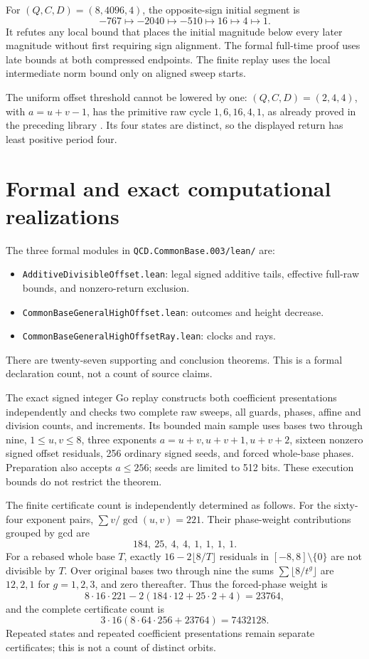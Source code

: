 \documentclass[11pt,letterpaper]{article}
\begin{document}
For \((Q,C,D)=(8,4096,4)\), the opposite-sign initial segment is
\[
-767\longmapsto-2040\longmapsto-510\longmapsto16\longmapsto4\longmapsto1.
\]
It refutes any local bound that places the initial magnitude below every
later magnitude without first requiring sign alignment. The formal
full-time proof uses late bounds at both compressed endpoints. The finite
replay uses the local intermediate norm bound only on aligned sweep starts.

The uniform offset threshold cannot be lowered by one:
\((Q,C,D)=(2,4,4)\), with \(a=u+v-1\), has the primitive raw cycle
\(1,6,16,4,1\), as already proved in the preceding library
\cite{AscendCommonBase}. Its four states are distinct, so the displayed
return has least positive period four.

\section{Formal and exact computational realizations}

The three formal modules in \texttt{QCD.CommonBase.003/lean/} are:
\begin{itemize}
\item \texttt{AdditiveDivisibleOffset.lean}: legal signed additive tails,
  effective full-raw bounds, and nonzero-return exclusion.
\item \texttt{CommonBaseGeneralHighOffset.lean}: outcomes and height decrease.
\item \texttt{CommonBaseGeneralHighOffsetRay.lean}: clocks and rays.
\end{itemize}
There are twenty-seven supporting and conclusion theorems. This is a formal
declaration count, not a count of source claims.

The exact signed integer Go replay constructs both coefficient presentations
independently and checks two complete raw sweeps, all guards, phases, affine
and division counts, and increments. Its bounded main sample uses bases
two through nine, \(1\le u,v\le8\), three exponents \(a=u+v,u+v+1,u+v+2\),
sixteen nonzero signed offset residuals, 256 ordinary signed seeds, and
forced whole-base phases. Preparation also accepts \(a\le256\); seeds are
limited to 512 bits. These execution bounds do not restrict the theorem.

The finite certificate count is independently determined as follows.
For the sixty-four exponent pairs,
\(\sum v/\gcd(u,v)=221\). Their phase-weight contributions grouped by gcd are
\[
184,\ 25,\ 4,\ 4,\ 1,\ 1,\ 1,\ 1.
\]
For a rebased whole base \(T\), exactly \(16-2\lfloor8/T\rfloor\) residuals
in \([-8,8]\setminus\{0\}\) are not divisible by \(T\).
Over original bases two through nine the sums
\(\sum\lfloor8/t^g\rfloor\) are \(12,2,1\) for \(g=1,2,3\), and zero thereafter.
Thus the forced-phase weight is
\[
8\cdot16\cdot221-2(184\cdot12+25\cdot2+4)=23764,
\]
and the complete certificate count is
\[
3\cdot16(8\cdot64\cdot256+23764)=7432128.
\]
Repeated states and repeated coefficient presentations remain separate
certificates; this is not a count of distinct orbits.
\end{document}
